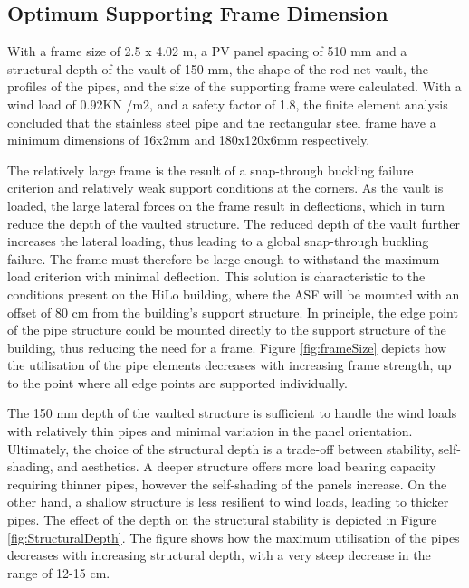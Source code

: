 \subsection{Optimum Supporting Frame Dimension}
\label{ch:structure}


With a frame size of 2.5 x 4.02 m, a PV panel spacing of 510 mm and a structural depth of the vault of 150 mm, the shape of the rod-net vault, the profiles  of the pipes, and the size of the supporting frame were calculated. With a wind load of 0.92KN /m2, and a safety factor of 1.8, the finite element analysis concluded that the stainless steel pipe and the rectangular steel frame have a minimum dimensions of 16x2mm and 180x120x6mm respectively. 

The relatively large frame is the result of a snap-through buckling failure criterion and relatively weak support conditions at the corners. As the vault is loaded, the large lateral forces on the frame result in deflections, which in turn reduce the depth of the vaulted structure. The reduced depth of the vault further increases the lateral loading, thus leading to a global snap-through buckling failure. The frame must therefore be large enough to withstand the maximum load criterion with minimal deflection. This solution is characteristic to the conditions present on the HiLo building, where the ASF will be mounted with an offset of 80 cm from the building's support structure. In principle, the edge point of the pipe structure could be mounted directly to the support structure of the building, thus reducing the need for a frame. Figure \ref{fig:frameSize} depicts how the utilisation of the pipe elements decreases with increasing frame strength, up to the point where all edge points are supported individually. 

The 150 mm depth of the vaulted structure is sufficient to handle the wind loads with relatively thin pipes and minimal variation in the panel orientation. Ultimately, the choice of the structural depth is a trade-off between stability,  self-shading, and aesthetics. A deeper structure offers more load bearing capacity requiring thinner pipes, however the self-shading of the panels increase. On the other hand, a shallow structure is less resilient to wind loads, leading to thicker pipes. The effect of the depth on the structural stability is depicted in Figure \ref{fig:StructuralDepth}. The figure shows how the maximum utilisation of the pipes decreases with increasing structural depth, with a very steep decrease in the range of 12-15 cm. 

